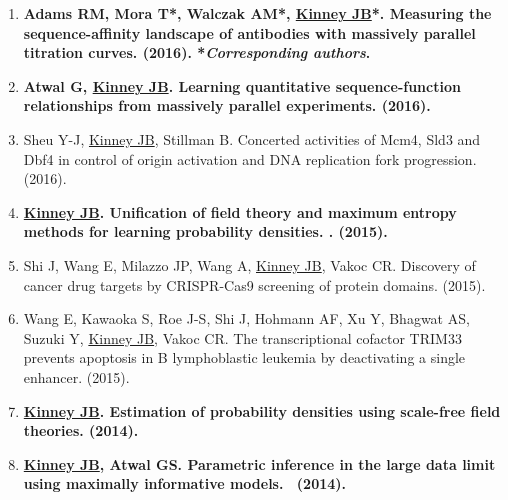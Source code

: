 \documentclass[10pt,hidelinks]{article}
\begin{document}
\begin{enumerate}
\item \textbf{Adams RM, Mora T*, Walczak AM*, \underline{Kinney JB}*. Measuring the sequence-affinity landscape of antibodies with massively parallel titration curves.  (2016). *\textit{Corresponding authors}.}

\item \textbf{Atwal G, \underline{Kinney JB}. Learning quantitative sequence-function relationships from massively parallel experiments.  (2016).}

\item Sheu Y-J, \underline{Kinney JB}, Stillman B. Concerted activities of Mcm4, Sld3 and Dbf4 in control of origin activation and DNA replication fork progression.  (2016).

\item \textbf{\underline{Kinney JB}. Unification of field theory and maximum entropy methods for learning probability densities. .  (2015).}

\item Shi J, Wang E, Milazzo JP, Wang A, \underline{Kinney JB}, Vakoc CR.  Discovery of cancer drug targets by CRISPR-Cas9 screening of protein domains.  (2015).

\item Wang E, Kawaoka S, Roe J-S, Shi J, Hohmann AF, Xu Y, Bhagwat AS,  Suzuki Y, \underline{Kinney JB}, Vakoc CR. The transcriptional cofactor TRIM33 prevents apoptosis in B lymphoblastic leukemia by deactivating a single enhancer.  (2015).

\item \textbf{\underline{Kinney JB}. Estimation of probability densities using scale-free field theories.  (2014). }

\item \textbf{\underline{Kinney JB}, Atwal GS. Parametric inference in the large data limit using maximally informative models.\  (2014).}


\end{enumerate}
\end{document}

